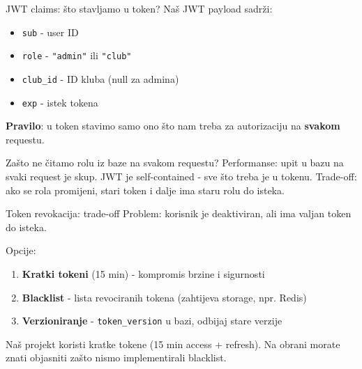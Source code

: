 \begin{frame}{JWT claims: što stavljamo u token?}
Naš JWT payload sadrži:
\begin{itemize}
  \item \texttt{sub} - user ID
  \item \texttt{role} - \texttt{"admin"} ili \texttt{"club"}
  \item \texttt{club\_id} - ID kluba (null za admina)
  \item \texttt{exp} - istek tokena
\end{itemize}

\vspace{0.6em}
\textbf{Pravilo}: u token stavimo samo ono što nam treba za autorizaciju na \textbf{svakom} requestu.

\vspace{0.4em}
\begin{block}{Zašto ne čitamo rolu iz baze na svakom requestu?}
Performanse: upit u bazu na svaki request je skup. JWT je self-contained - sve što treba je u tokenu.
Trade-off: ako se rola promijeni, stari token i dalje ima staru rolu do isteka.
\end{block}
\end{frame}

\begin{frame}{Token revokacija: trade-off}
Problem: korisnik je deaktiviran, ali ima valjan token do isteka.

\vspace{0.6em}
Opcije:
\begin{enumerate}
  \item \textbf{Kratki tokeni} (15 min) - kompromis brzine i sigurnosti
  \item \textbf{Blacklist} - lista revociranih tokena (zahtijeva storage, npr. Redis)
  \item \textbf{Verzioniranje} - \texttt{token\_version} u bazi, odbijaj stare verzije
\end{enumerate}

\vspace{0.6em}
Naš projekt koristi kratke tokene (15 min access + refresh). Na obrani morate znati objasniti zašto nismo implementirali blacklist.
\end{frame}

